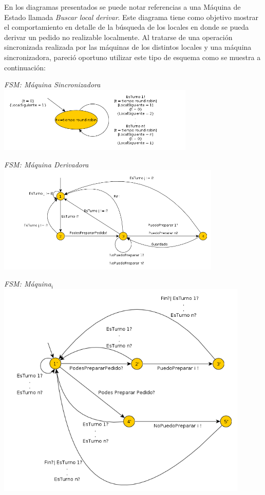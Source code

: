 \documentclass[a4paper,11pt] {article}
\begin{document}
En los diagramas presentados se puede notar referencias a una M\'aquina de Estado llamada \textit{Buscar local derivar}. Este diagrama tiene como objetivo mostrar el comportamiento en detalle de la b\'usqueda de los locales en donde se pueda derivar un pedido no realizable localmente. Al tratarse de una operaci\'on sincronizada realizada por las m\'aquinas de los distintos locales y una máquina sincronizadora, pareci\'o oportuno utilizar este tipo de esquema como se muestra a continuaci\'on:


\begin{center}
 \textit{FSM: M\'aquina Sincronizadora}
 \includegraphics[width=0.7\textwidth]{Diagramas/FSMSincronizador.png}
\end{center}


\begin{center}
 \textit{FSM: M\'aquina Derivadora}
 \includegraphics[width=0.8\textwidth]{Diagramas/FSMPrepararPedido.png}
\end{center}


\begin{center}
 \textit{FSM: M\'aquina$_{i}$}
 \includegraphics[width=0.9\textwidth]{Diagramas/FSMPrepararPedidoi.png}
\end{center}
\end{document}
